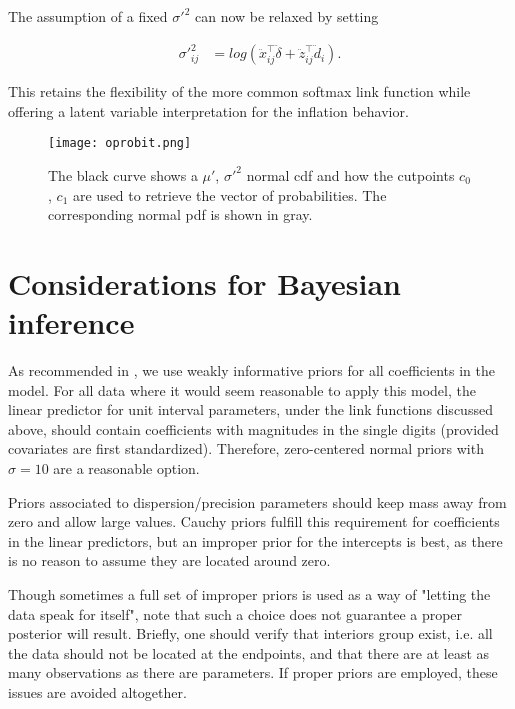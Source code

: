 The assumption of a fixed $\sigma'^{2}$ can now be relaxed by setting

\begin{equation}
\begin{split}
\sigma'^{2}_{ij} &= log(\ddot{x}_{ij}^{\top} \ddot{\delta}+\ddot{z}_{ij}^{\top} \ddot{d}_i).
\end{split}
\label{eq:oprobit2}
\end{equation}

This retains the flexibility of the more common softmax link function while offering a latent variable interpretation for the inflation behavior.

\begin{figure}
  \texttt{[image: oprobit.png]}
  \caption{The black curve shows a $\mu'$, $\sigma'^{2}$ normal cdf and how the cutpoints $c_0$, $c_1$ are used to retrieve the vector of probabilities. The corresponding normal pdf is shown in gray.}
  \label{fig:oprobit}
\end{figure}

\section{Considerations for Bayesian inference}

As recommended in \cite{Gelman2013}, we use weakly informative priors for all coefficients in the model. For all data where it would seem reasonable to apply this model, the linear predictor for unit interval parameters, under the link functions discussed above, should contain coefficients with magnitudes in the single digits (provided covariates are first standardized). Therefore, zero-centered normal priors with $\sigma=10$ are a reasonable option.

Priors associated to dispersion/precision parameters should keep mass away from zero and allow large values. Cauchy priors fulfill this requirement for coefficients in the linear predictors, but an improper prior for the intercepts is best, as there is no reason to assume they are located around zero.

Though sometimes a full set of improper priors is used as a way of "letting the data speak for itself",  note that such a choice does not guarantee a proper posterior will result. \cite{Tak2015} Briefly, one should verify that interiors group exist, i.e. all the data should not be located at the endpoints, and that there are at least as many observations as there are parameters. If proper priors are employed, these issues are avoided altogether.

